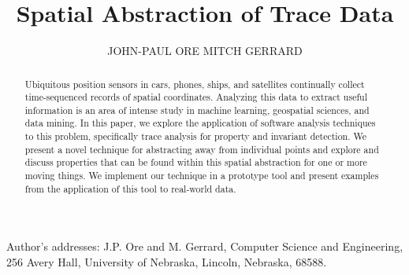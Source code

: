 \documentclass[prodmode,acmtecs]{acmsmall} %
\begin{document}

\title{Spatial Abstraction of Trace Data}
\author{JOHN-PAUL ORE
MITCH GERRARD
}

\begin{abstract}
Ubiquitous position sensors in cars, phones, ships, and satellites continually collect time-sequenced records of spatial coordinates.
Analyzing this data to extract useful information is an area of intense study in machine learning, geospatial sciences, and data mining.
In this paper, we explore the application of software analysis techniques to this problem, specifically trace analysis for property and invariant detection.
We present a novel technique for abstracting away from individual points and explore and discuss properties that can be found within this spatial abstraction for one or more moving things.
We implement our technique in a prototype tool and present examples from the application of this tool to real-world data.
\end{abstract}




\begin{bottomstuff}


Author's addresses: J.P. Ore and M. Gerrard, Computer Science and Engineering,
256 Avery Hall,
University of Nebraska, 
Lincoln, Nebraska, 68588. 
\end{bottomstuff}
\end{document}
